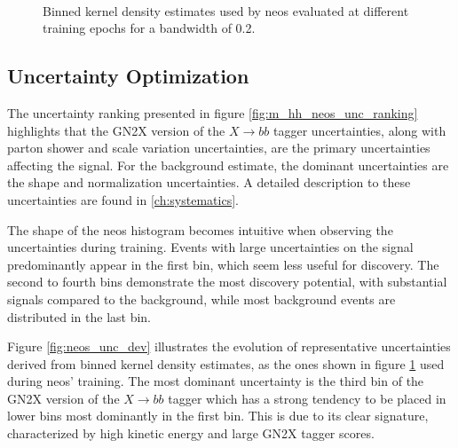 \begin{figure}
    \centering
    \\
    \caption[]{ Binned kernel density estimates used by \ac{neos} evaluated at different training epochs for a bandwidth of 0.2.}
    \label{fig:neos_valid_kde_hists}
\end{figure}



\subsection{Uncertainty Optimization}

The uncertainty ranking presented in figure \ref{fig:m_hh_neos_unc_ranking} highlights that the GN2X version of the $X \rightarrow bb$ tagger uncertainties, along with parton shower and scale variation uncertainties, are the primary uncertainties affecting the signal. For the background estimate, the dominant uncertainties are the shape and normalization uncertainties. A detailed description to these uncertainties are found in \ref{ch:systematics}.


The shape of the \ac{neos} histogram becomes intuitive when observing the uncertainties during training. Events with large uncertainties on the signal predominantly appear in the first bin, which seem less useful for discovery. The second to fourth bins demonstrate the most discovery potential, with substantial signals compared to the background, while most background events are distributed in the last bin.

Figure \ref{fig:neos_unc_dev} illustrates the evolution of representative uncertainties derived from binned kernel density estimates, as the ones shown in figure \ref{fig:neos_valid_kde_hists}  used during \ac{neos}' training. The most dominant uncertainty is the third \pt bin of the GN2X version of the $X \rightarrow bb$ tagger which has a strong tendency to be placed in lower bins most dominantly in the first bin. This is due to its clear signature, characterized by high kinetic energy and large GN2X tagger scores.


